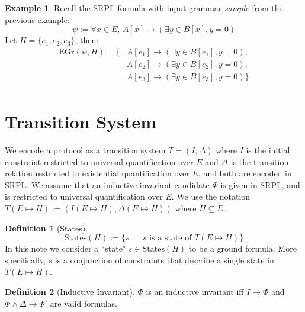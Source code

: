 \documentclass[12pt]{article}
\theoremstyle{definition}
\newtheorem{definition}{Definition}
\newtheorem{example}{Example}
\theoremstyle{remark}
\newcommand{\st}{\text{ }|\text{ }}
\newcommand{\states}{\text{States}}
\newcommand{\gr}{\text{EGr}}
\begin{document}
\begin{example}
  Recall the SRPL formula with input grammar \textit{sample} from the previous example:
  $$\psi := \forall x \in E, \, A[x] \rightarrow (\exists y \in B[x], y = 0)$$
  Let $H = \{e_1,e_2,e_3\}$, then:
  \begin{align*}
    \gr(\psi,H) = \{&A[e_1] \rightarrow (\exists y \in B[e_1], y = 0),\\
    &A[e_2] \rightarrow (\exists y \in B[e_2], y = 0),\\
    &A[e_3] \rightarrow (\exists y \in B[e_3], y = 0)\}\\
  \end{align*}
\end{example}



\section{Transition System}

We encode a protocol as a transition system $T=(I,\Delta)$ where $I$ is the initial constraint restricted to universal quantification over $E$ and $\Delta$ is the transition relation restricted to existential quantification over $E$, and both are encoded in SRPL.  We assume that an inductive invariant candidate $\Phi$ is given in SRPL, and is restricted to universal quantification over $E$.  We use the notation $T(E \mapsto H):=(I(E \mapsto H),\Delta(E \mapsto H))$ where $H \subseteq E$.

\begin{definition}[States]
  $$\states(H) := \{s \st s \text{ is a state of } T(E \mapsto H)\}$$
  In this note we consider a ``state" $s \in \states(H)$ to be a ground formula.  More specifically, $s$ is a conjunction of constraints that describe a single state in $T(E \mapsto H)$.
\end{definition}

\begin{definition}[Inductive Invariant]
  $\Phi$ is an inductive invariant iff $I \rightarrow \Phi$ and $\Phi \land \Delta \rightarrow \Phi'$ are valid formulas.
\end{definition}
\end{document}
